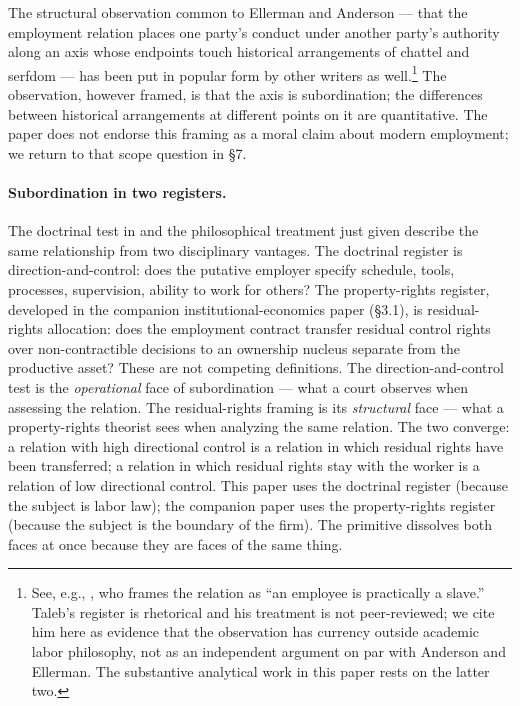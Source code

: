 \documentclass[11pt,a4paper]{article}
\theoremstyle{remark}
\begin{document}
The structural observation common to Ellerman and Anderson --- that
the employment relation places one party's conduct under another
party's authority along an axis whose endpoints touch
historical arrangements of chattel and serfdom --- has been put
in popular form by other writers as well.\footnote{See, e.g.,
\citet[][Book 4, Ch.\ 3, ``How to Legally Own Another
Person'']{taleb2018skin}, who frames the relation as ``an
employee is practically a slave.'' Taleb's register is rhetorical
and his treatment is not peer-reviewed; we cite him here as
evidence that the observation has currency outside academic labor
philosophy, not as an independent argument on par with Anderson
and Ellerman. The substantive analytical work in this paper rests
on the latter two.} The observation, however framed, is that the
axis is subordination; the differences between historical
arrangements at different points on it are quantitative. The
paper does not endorse this framing as a moral claim about
modern employment; we return to that scope question in §7.

\paragraph{Subordination in two registers.}
The doctrinal test in  and the
philosophical treatment just given describe the same
relationship from two disciplinary vantages. The doctrinal register
is direction-and-control: does the putative employer specify
schedule, tools, processes, supervision, ability to work for
others? The property-rights register, developed in the
companion institutional-economics paper (§3.1),
is residual-rights allocation: does the employment contract
transfer residual control rights over non-contractible decisions
to an ownership nucleus separate from the productive asset?
These are not competing definitions. The direction-and-control
test is the \emph{operational} face of subordination --- what a
court observes when assessing the relation. The residual-rights
framing is its \emph{structural} face --- what a property-rights
theorist sees when analyzing the same relation. The two
converge: a relation with high directional control is a relation
in which residual rights have been transferred; a relation in
which residual rights stay with the worker is a relation of low
directional control. This paper uses the doctrinal register
(because the subject is labor law); the companion paper uses the
property-rights register (because the subject is the boundary of
the firm). The primitive dissolves both faces at once because
they are faces of the same thing.
\end{document}
